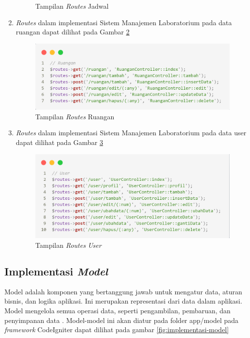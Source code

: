 \begin{enumerate}
\begin{figure}
		      \caption{Tampilan \textit{Routes} Jadwal}
		      \label{fig:routes-jadwal}
	      \end{figure}
	\item \textit{Routes} dalam implementasi Sistem Manajemen Laboratorium pada data ruangan dapat dilihat pada Gambar \ref{fig:routes-ruangan}
	      \begin{figure}
		      \centering
		      \includegraphics[width=0.82\linewidth]{konten//gambar/routes/ruangan.png}
		      \caption{Tampilan \textit{Routes} Ruangan}
		      \label{fig:routes-ruangan}
	      \end{figure}
	\item \textit{Routes} dalam implementasi Sistem Manajemen Laboratorium pada data user dapat dilihat pada Gambar \ref{fig:routes-user}
	      \begin{figure}
		      \centering
		      \includegraphics[width=0.82\linewidth]{konten//gambar/routes/user.png}
		      \caption{Tampilan \textit{Routes} \textit{User}}
		      \label{fig:routes-user}
	      \end{figure}
\end{enumerate}

\subsection{Implementasi \textit{Model}}
Model adalah komponen yang bertanggung jawab untuk mengatur data, aturan bisnis, dan logika aplikasi. Ini merupakan representasi dari data dalam aplikasi. Model mengelola semua operasi data, seperti pengambilan, pembaruan, dan penyimpanan data \cite{firdaus2020rancang}. Model-model ini akan diatur pada folder app/model pada \textit{framework} CodeIgniter dapat dilihat pada gambar \ref{fig:implementasi-model}



